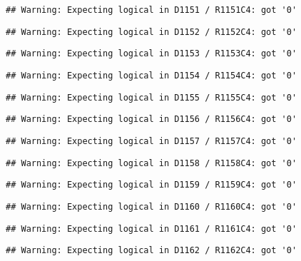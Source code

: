 \documentclass[
]{article}
\newenvironment{Shaded}{\begin{snugshade}}{\end{snugshade}}
\newcommand{\FunctionTok}[1]{\textcolor[rgb]{0.13,0.29,0.53}{\textbf{#1}}}
\newcommand{\NormalTok}[1]{#1}
\newcommand{\OtherTok}[1]{\textcolor[rgb]{0.56,0.35,0.01}{#1}}
\newcommand{\SpecialCharTok}[1]{\textcolor[rgb]{0.81,0.36,0.00}{\textbf{#1}}}
\begin{document}
\begin{verbatim}
## Warning: Expecting logical in D1151 / R1151C4: got '0'
\end{verbatim}

\begin{verbatim}
## Warning: Expecting logical in D1152 / R1152C4: got '0'
\end{verbatim}

\begin{verbatim}
## Warning: Expecting logical in D1153 / R1153C4: got '0'
\end{verbatim}

\begin{verbatim}
## Warning: Expecting logical in D1154 / R1154C4: got '0'
\end{verbatim}

\begin{verbatim}
## Warning: Expecting logical in D1155 / R1155C4: got '0'
\end{verbatim}

\begin{verbatim}
## Warning: Expecting logical in D1156 / R1156C4: got '0'
\end{verbatim}

\begin{verbatim}
## Warning: Expecting logical in D1157 / R1157C4: got '0'
\end{verbatim}

\begin{verbatim}
## Warning: Expecting logical in D1158 / R1158C4: got '0'
\end{verbatim}

\begin{verbatim}
## Warning: Expecting logical in D1159 / R1159C4: got '0'
\end{verbatim}

\begin{verbatim}
## Warning: Expecting logical in D1160 / R1160C4: got '0'
\end{verbatim}

\begin{verbatim}
## Warning: Expecting logical in D1161 / R1161C4: got '0'
\end{verbatim}

\begin{verbatim}
## Warning: Expecting logical in D1162 / R1162C4: got '0'
\end{verbatim}

\begin{Shaded}
\end{Shaded}
\end{document}
